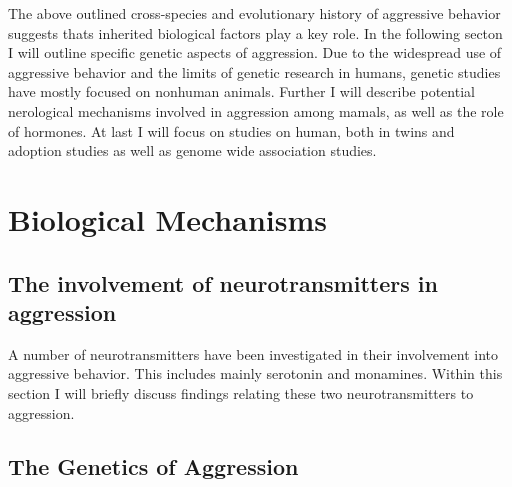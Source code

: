 The above outlined cross-species and evolutionary history of aggressive behavior suggests thats inherited biological factors play a key role.
In the following secton I will outline specific genetic aspects of aggression.
Due to the widespread use of aggressive behavior and the limits of genetic research in humans, genetic studies have mostly focused on nonhuman animals.
Further I will describe potential nerological mechanisms involved in aggression among mamals, as well as the role of hormones.
At last I will focus on studies on human, both in twins and adoption studies as well as genome wide association studies.


\section{Biological Mechanisms}
\label{sec:biological_mechanisms}

\subsection{The involvement of neurotransmitters in aggression}
\label{sub:the_involvement_of_neurotransmitters_in_aggression}

A number of neurotransmitters have been investigated in their involvement into aggressive behavior.
This includes mainly serotonin and monamines.
Within this section I will briefly discuss findings relating these two neurotransmitters to aggression.


\subsection{The Genetics of Aggression}
\label{sub:the_genetics_of_aggression}

